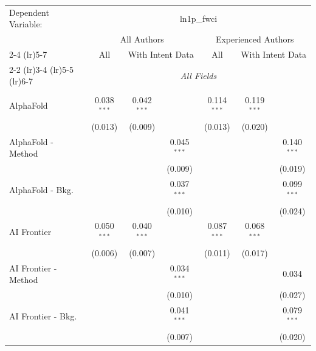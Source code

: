 \begingroup
\centering
\begin{tabular}{lcccccc}
   \tabularnewline \midrule \midrule
   Dependent Variable: & \multicolumn{6}{c}{ln1p\_fwci}\\
 & \multicolumn{3}{c}{All Authors} & \multicolumn{3}{c}{Experienced Authors} \\
\cmidrule(lr){2-4} \cmidrule(lr){5-7}
 & \multicolumn{1}{c}{All} & \multicolumn{2}{c}{With Intent Data} & \multicolumn{1}{c}{All} & \multicolumn{2}{c}{With Intent Data} \\
\cmidrule(lr){2-2} \cmidrule(lr){3-4} \cmidrule(lr){5-5} \cmidrule(lr){6-7}
 & \multicolumn{6}{c}{\textit{All Fields}} \\ \\
   AlphaFold            & 0.038$^{***}$ & 0.042$^{***}$ &               & 0.114$^{***}$ & 0.119$^{***}$ &   \\   
                        & (0.013)       & (0.009)       &               & (0.013)       & (0.020)       &   \\   
   AlphaFold - Method   &               &               & 0.045$^{***}$ &               &               & 0.140$^{***}$\\   
                        &               &               & (0.009)       &               &               & (0.019)\\   
   AlphaFold - Bkg.     &               &               & 0.037$^{***}$ &               &               & 0.099$^{***}$\\   
                        &               &               & (0.010)       &               &               & (0.024)\\   
   AI Frontier          & 0.050$^{***}$ & 0.040$^{***}$ &               & 0.087$^{***}$ & 0.068$^{***}$ &   \\   
                        & (0.006)       & (0.007)       &               & (0.011)       & (0.017)       &   \\   
   AI Frontier - Method &               &               & 0.034$^{***}$ &               &               & 0.034\\   
                        &               &               & (0.010)       &               &               & (0.027)\\   
   AI Frontier - Bkg.   &               &               & 0.041$^{***}$ &               &               & 0.079$^{***}$\\   
                        &               &               & (0.007)       &               &               & (0.020)\\   

\end{tabular}
